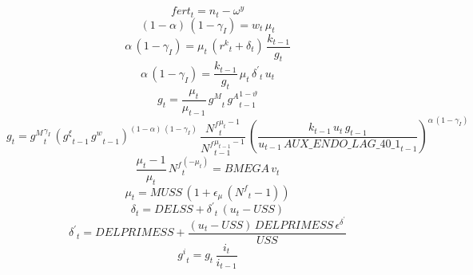 \begin{dmath}
{{fert}}_{t}={{n}}_{t}-{{\omega^{y}}}
\end{dmath}
\begin{dmath}
\left(1-{{\alpha}}\right)\, \left(1-{{\gamma_I}}\right)={{w}}_{t}\, {{\mu}}_{t}
\end{dmath}
\begin{dmath}
{{\alpha}}\, \left(1-{{\gamma_I}}\right)={{\mu}}_{t}\, \left({{r^k}}_{t}+{{\delta}}_{t}\right)\, \frac{{{k}}_{t-1}}{{{g}}_{t}}
\end{dmath}
\begin{dmath}
{{\alpha}}\, \left(1-{{\gamma_I}}\right)=\frac{{{k}}_{t-1}}{{{g}}_{t}}\, {{\mu}}_{t}\, {{\delta^\prime}}_{t}\, {{u}}_{t}
\end{dmath}
\begin{dmath}
{{g}}_{t}=\frac{{{\mu}}_{t}}{{{\mu}}_{t-1}}\, {{g^M}}_{t}\, {{g^A}}_{t-1}^{1-{{\vartheta}}}
\end{dmath}
\begin{dmath}
{{g}}_{t}={{g^M}}_{t}^{{{\gamma_I}}}\, \left({{g^{\xi}}}_{t-1}\, {{g^w}}_{t-1}\right)^{\left(1-{{\alpha}}\right)\, \left(1-{{\gamma_I}}\right)}\, \frac{{{N^f}}_{t}^{{{\mu}}_{t}-1}}{{{N^f}}_{t-1}^{{{\mu}}_{t-1}-1}}\, \left(\frac{{{k}}_{t-1}\, {{u}}_{t}\, {{g}}_{t-1}}{{{u}}_{t-1}\, {AUX\_ENDO\_LAG\_40\_1}_{t-1}}\right)^{{{\alpha}}\, \left(1-{{\gamma_I}}\right)}
\end{dmath}
\begin{dmath}
\frac{{{\mu}}_{t}-1}{{{\mu}}_{t}}\, {{N^f}}_{t}^{\left(-{{\mu}}_{t}\right)}={{BMEGA}}\, {{v}}_{t}
\end{dmath}
\begin{dmath}
{{\mu}}_{t}={{MUSS}}\, \left(1+{{\epsilon_{\mu}}}\, \left({{N^f}}_{t}-1\right)\right)
\end{dmath}
\begin{dmath}
{{\delta}}_{t}={{DELSS}}+{{\delta^\prime}}_{t}\, \left({{u}}_{t}-{{USS}}\right)
\end{dmath}
\begin{dmath}
{{\delta^\prime}}_{t}={{DELPRIMESS}}+\frac{\left({{u}}_{t}-{{USS}}\right)\, {{DELPRIMESS}}\, {{\epsilon^{\delta^{\prime}}}}}{{{USS}}}
\end{dmath}
\begin{dmath}
{{g^i}}_{t}={{g}}_{t}\, \frac{{{i}}_{t}}{{{i}}_{t-1}}
\end{dmath}
